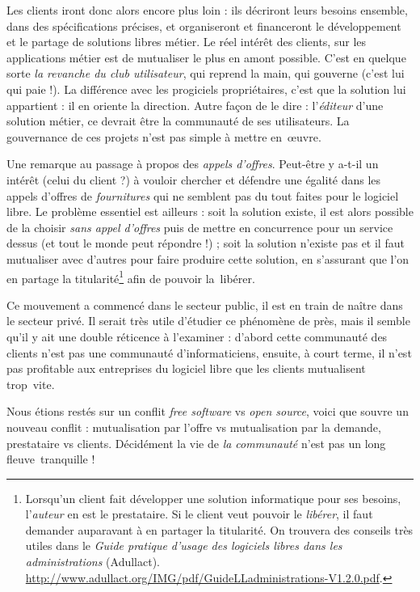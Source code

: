 \documentclass{FramateX}
\begin{document}
\begin{refsection}
Les clients iront donc alors encore plus loin : ils décriront leurs
besoins ensemble, dans des spécifications précises, et organiseront et
financeront le développement et le partage de solutions libres métier.
Le réel intérêt des clients, sur les applications métier est de
mutualiser le plus en amont possible. C'est en quelque sorte \textit{la
revanche du club utilisateur}, qui reprend la main, qui gouverne (c'est
lui qui paie !). La différence avec les progiciels propriétaires, c'est que
la solution lui appartient : il en oriente la direction. Autre façon de
le dire : l'\textit{éditeur} d'une solution métier, ce devrait être la
communauté de ses utilisateurs. La gouvernance de ces projets n'est pas
simple à mettre en~œuvre.

\begin{encart}
Une remarque au passage à propos des \textit{appels d'offres}. Peut-être
y a-t-il un intérêt (celui du client ?) à vouloir chercher et défendre
une égalité dans les appels d'offres de \textit{fournitures} qui ne
semblent pas du tout faites pour le logiciel libre. Le problème
essentiel est ailleurs : soit la solution existe, il est alors possible
de la choisir \textit{sans appel d'offres} puis de mettre en
concurrence pour un service dessus (et tout le monde peut répondre !) ;
soit la solution n'existe pas et il faut mutualiser avec d'autres pour
faire produire cette solution, en s'assurant que l'on en partage la
titularité\footnote{Lorsqu'un client fait développer une solution
informatique pour ses besoins, l'\textit{auteur }en est le prestataire.
Si le client veut pouvoir le \textit{libérer}, il faut demander
auparavant à en partager la titularité. On trouvera des conseils très
utiles dans le \textit{Guide pratique d'usage des logiciels libres dans les administrations} (Adullact). \url{http://www.adullact.org/IMG/pdf/GuideLLadministrations-V1.2.0.pdf}.} afin de pouvoir la~libérer. 
\end{encart}

Ce mouvement a commencé dans le secteur public, il est en train de
naître dans le secteur privé. Il serait très utile d'étudier ce
phénomène de près, mais il semble qu'il y ait une double réticence à
l'examiner : d'abord cette communauté des clients n'est pas une
communauté d'informaticiens, ensuite, à court terme, il n'est pas
profitable aux entreprises du logiciel libre que les clients
mutualisent trop~vite.

Nous étions restés sur un conflit \textit{free software }vs \textit{open
source}, voici que souvre un nouveau conflit : mutualisation par
l'offre vs mutualisation par la demande, prestataire vs clients.
Décidément la vie de \textit{la communauté} n'est pas un long
fleuve~tranquille !


\end{refsection}
\end{document}

